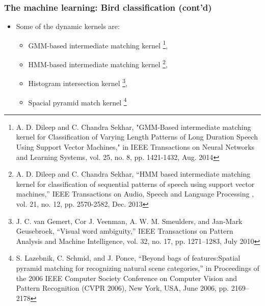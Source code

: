 \documentclass[mathserif]{beamer}
\begin{document}
\begin{frame}
\frametitle{The machine learning: Bird classification (cont'd)}
\begin{itemize}
\item<2-> Some of the dynamic kernels are:
\begin{itemize}
	\item GMM-based intermediate matching kernel \footnote{
	A. D. Dileep and C. Chandra Sekhar, "GMM-Based intermediate matching kernel for Classification of Varying Length Patterns of Long Duration Speech Using Support Vector Machines," in IEEE Transactions on Neural Networks and Learning Systems, vol. 25, no. 8, pp. 1421-1432, Aug. 2014},
	\item HMM-based intermediate matching kernel \footnote{A. D. Dileep and C. Chandra Sekhar, “HMM based intermediate matching kernel for classification of sequential patterns of speech using support vector machines,” IEEE Transactions on Audio, Speech and Language Processing , vol. 21, no. 12, pp. 2570-2582, Dec. 2013}, 
	\item Histogram intersection kernel \footnote{J. C. van Gemert, Cor J. Veenman, A. W. M. Smeulders, and Jan-Mark Geusebroek, “Visual word ambiguity,” IEEE Transactions on Pattern Analysis and Machine Intelligence, vol. 32, no. 17, pp. 1271–1283, July 2010}, 
	\item Spacial pyramid match kernel \footnote{S. Lazebnik, C. Schmid, and J. Ponce, “Beyond bags of features:Spatial pyramid matching for recognizing natural scene categories,” in Proceedings of the 2006 IEEE Computer Society Conference on Computer Vision and Pattern Recognition (CVPR 2006), New York, USA, June 2006, pp. 2169–2178}
\end{itemize}
\end{itemize}
\end{frame}
\end{document}
